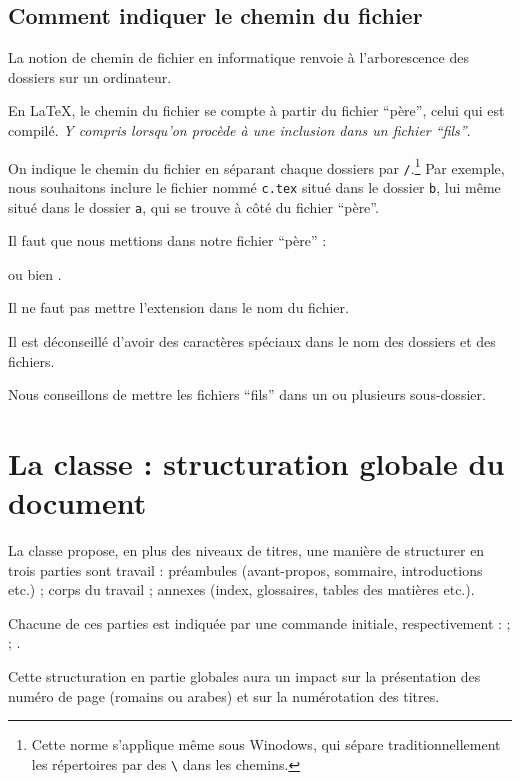 \subsection{Comment indiquer le chemin du fichier}\label{chemin}

La notion de chemin de fichier en informatique renvoie à l'arborescence des dossiers sur un ordinateur.

En \LaTeX{}, le chemin du fichier se compte à partir du fichier \enquote{père}, celui qui est compilé. \emph{Y compris lorsqu'on procède à une inclusion dans un fichier \enquote{fils}}.

On indique le chemin du fichier en séparant chaque dossiers par \verb|/|.\footnote{Cette norme s'applique même sous Winodows, qui sépare traditionnellement les répertoires par des \verb|\| dans les chemins.} Par exemple, nous souhaitons inclure le fichier nommé \verb|c.tex| situé dans le dossier \verb|b|, lui même situé dans le dossier \verb|a|, qui se trouve à côté du fichier \enquote{père}.

Il faut que nous mettions dans notre fichier \enquote{père} :

\verb|| ou bien \verb||.

\begin{attention}

Il ne faut pas mettre l'extension  dans le nom du fichier.

Il est déconseillé d'avoir des caractères spéciaux dans le nom des dossiers et des fichiers.
\end{attention}

Nous conseillons de mettre les fichiers \enquote{fils} dans un ou plusieurs sous-dossier.

\section{La classe  : structuration globale du document}

La classe  propose, en plus des niveaux de titres, une manière de structurer en trois parties sont travail : préambules (avant-propos, sommaire, introductions etc.) ; corps du travail ; annexes (index, glossaires, tables des matières etc.). 

Chacune de ces parties est indiquée par une commande initiale, respectivement :  ;  ; .

Cette structuration en partie globales aura un impact sur la présentation des numéro de page (romains ou arabes) et sur la numérotation des titres.

 
